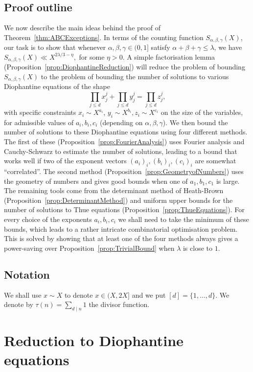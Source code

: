 \section*{Proof outline} We now describe the main ideas behind the proof of Theorem~\ref{thm:ABCExceptions}. In terms of the counting function $S_{\alpha,\beta,\gamma}(X)$, our task is to show that whenever $\alpha,\beta,\gamma\in (0,1]$ satisfy $\alpha+\beta+\gamma\leq \lambda$, we have
$
S_{\alpha,\beta,\gamma}(X)\ll X^{2\lambda/3-\eta},
$
for some $\eta>0$.
A simple factorisation lemma (Proposition~\ref{prop:DiophantineReduction}) will reduce the problem of bounding $S_{\alpha,\beta,\gamma}(X)$ to the problem of bounding the number of solutions to various Diophantine equations of the shape
\[
\prod_{j\leq d}x_j^j+\prod_{j\leq d}y_j^j=\prod_{j\leq d}z_j^j ,
\]
with specific constraints $x_i\sim X^{a_i}$, $y_i\sim X^{b_i}, z_i\sim X^{c_i}$ on the size of the variables, for admissible values of $a_i,b_i,c_i$ (depending on $\alpha,\beta,\gamma$).
We then bound the number of solutions to these Diophantine equations using four different methods. The first of these (Proposition~\ref{prop:FourierAnalysis}) uses Fourier analysis and Cauchy-Schwarz to estimate the number of solutions, leading to a bound that works well if two of the exponent vectors $(a_i)_i,(b_i)_i,(c_i)_i$ are somewhat ``correlated''. The second method (Proposition~\ref{prop:GeometryofNumbers}) uses the geometry of numbers and gives good bounds when
one of $a_1,b_1,c_1$ is large. The remaining tools come from the determinant method of Heath-Brown (Proposition~\ref{prop:DeterminantMethod}) and
uniform upper bounds for the number of solutions to Thue equations (Proposition~\ref{prop:ThueEquations}).
For every choice of the exponents $a_i,b_i,c_i$ we shall need to take the minimum of these bounds, which leads to a rather intricate combinatorial optimisation problem. This is solved by showing that at least one of the four methods always gives a power-saving over Proposition~\ref{prop:TrivialBound} when $\lambda$ is close to $1$.

\section*{Notation}
We shall use $x\sim X$ to denote $x\in (X,2X]$ and we put
$[d]=\{1,\dots,d\}$. We denote by $\tau(n)=\sum_{d\mid n}1$ the divisor function.


\chapter{Reduction to Diophantine equations}


